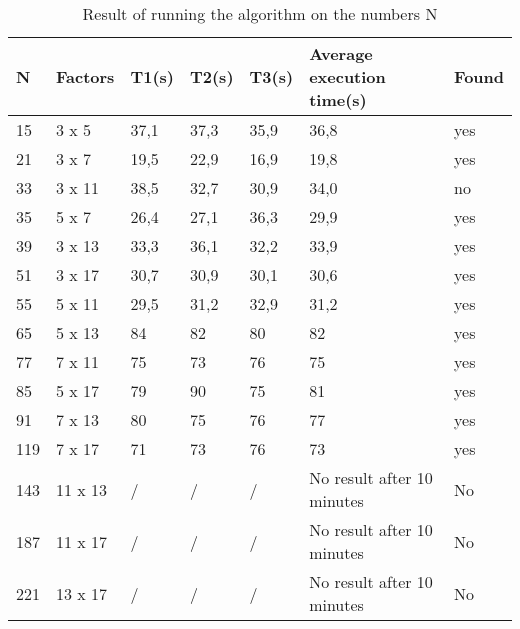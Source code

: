 \begin{table}[h]
\label{tab:quantumresults}
    \caption{Result of running the algorithm on the numbers N}
    \begin{tabular}{|l|l|l|l|l|l|l|}
    \hline
    N   & Factors   & T1(s) & T2(s) & T3(s) & Average execution time(s)       & Found              \\ \hline
    15  & 3 x 5   & 37,1  & 37,3  & 35,9  & 36,8                              & yes                \\
    21  & 3 x 7   & 19,5  & 22,9  & 16,9  & 19,8                              & yes                \\
    33  & 3 x 11  & 38,5  & 32,7  & 30,9  & 34,0                              & no                 \\
    35  & 5 x 7   & 26,4  & 27,1  & 36,3  & 29,9                              & yes                \\
    39  & 3 x 13  & 33,3  & 36,1  & 32,2  & 33,9                              & yes                \\
    51  & 3 x 17  & 30,7  & 30,9  & 30,1  & 30,6                              & yes                \\
    55  & 5 x 11  & 29,5  & 31,2  & 32,9  & 31,2                              & yes                \\
    65  & 5 x 13  & 84    & 82    & 80    & 82                                & yes                \\
    77  & 7 x 11  & 75    & 73    & 76    & 75                                & yes                \\
    85  & 5 x 17  & 79    & 90    & 75    & 81                                & yes                \\
    91  & 7 x 13  & 80    & 75    & 76    & 77                                & yes                \\
    119 & 7 x 17  & 71    & 73    & 76    & 73                                & yes                \\
    143 & 11 x 13 & /     & /     & /     & No result after 10 minutes        & No                 \\
    187 & 11 x 17 & /     & /     & /     & No result after 10 minutes        & No                 \\
    221 & 13 x 17 & /     & /     & /     & No result after 10 minutes        & No                 \\ \hline
    \end{tabular}
\end{table}

